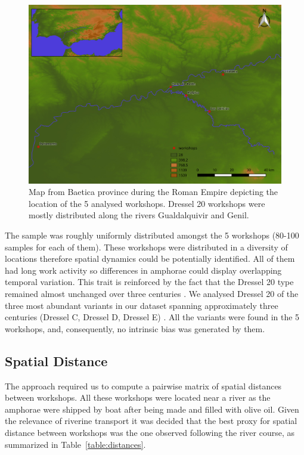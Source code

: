 \documentclass[review]{elsarticle}
\begin{document}
\begin{figure}[htp]
	\centering
\includegraphics[width=\linewidth]{figs/romanworkshop}
\caption{Map from Baetica province during the Roman Empire depicting the location of the 5 analysed workshops. Dressel 20 workshops were mostly distributed along the rivers Gualdalquivir and Genil.}
\label{romanworkshop}
\end{figure} 

The sample was roughly uniformly distributed amongst the 5 workshops (80-100 samples for each of them). These workshops were distributed in a diversity of locations therefore spatial dynamics could be potentially identified. All of them had long work activity so differences in amphorae could display overlapping temporal variation. This trait is reinforced by the fact that the Dressel 20 type remained almost unchanged over three centuries \citep{berni_dressel_2016}. We analysed Dressel 20 of the three most abundant variants in our dataset spanning approximately three centuries (Dressel C, Dressel D, Dressel E) \citep{martin-kilcher_romischen_1994,berni_millet_epigrafianforica_2008}. All the variants were found in the 5 workshops, and, consequently, no intrinsic bias was generated by them. 

\subsection{Spatial Distance}

The approach required us to compute a pairwise matrix of spatial distances between workshops. All these workshops were located near a river as the amphorae were shipped by boat after being made and filled with olive oil. Given the relevance of riverine transport it was decided that the best proxy for spatial distance between workshops was the one observed following the river course, as summarized in Table~\ref{table:distances}.
\end{document}
